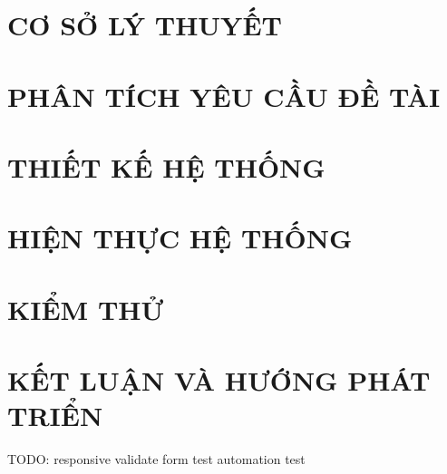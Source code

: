 \documentclass[12pt, a4paper]{report}
\begin{document}
\chapter{\textbf{CƠ SỞ LÝ THUYẾT}}
\newpage

\newpage
\chapter{\textbf{PHÂN TÍCH YÊU CẦU ĐỀ TÀI}}
\newpage

\newpage
\chapter{\textbf{THIẾT KẾ HỆ THỐNG}}
\newpage

\newpage

\chapter{\textbf{HIỆN THỰC HỆ THỐNG}}
\newpage

\newpage

\chapter{\textbf{KIỂM THỬ}}
\newpage

\newpage

\chapter{\textbf{KẾT LUẬN VÀ HƯỚNG PHÁT TRIỂN}}
\newpage



TODO: responsive
validate form
test
automation test
\end{document}
